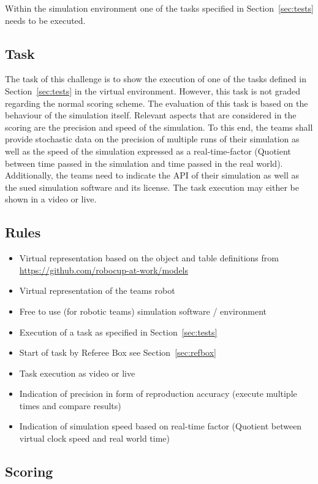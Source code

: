   Within the simulation environment one of the tasks specified in Section~\ref{sec:tests} needs to be executed.

\subsection{Task}

The task of this challenge is to show the execution of one of the tasks defined in Section~\ref{sec:tests} in the virtual environment. However, this task is not graded regarding the normal scoring scheme. The evaluation of this task is based on the behaviour of the simulation itself. Relevant aspects that are considered in the scoring are the precision and speed of the simulation. To this end, the teams shall provide stochastic data on the precision of multiple runs of their simulation  as well as the speed of the simulation expressed as a real-time-factor (Quotient between time passed in the simulation and time passed in the real world). Additionally, the teams need to indicate the API of their simulation as well as the sued simulation software and its license. The task execution may either be shown in a video or live. 

\subsection{Rules}

\begin{itemize}
  \item Virtual representation based on the object and table definitions from \url{https://github.com/robocup-at-work/models}
  \item Virtual representation of the teams robot
  \item Free to use (for robotic teams) simulation software / environment
  \item Execution of a task as specified in Section~\ref{sec:tests}
  \item Start of task by Referee Box see Section~\ref{sec:refbox}
  \item Task execution as video or live
  \item Indication of precision in form of reproduction accuracy (execute multiple times and compare results)
  \item Indication of simulation speed based on real-time factor (Quotient between virtual clock speed and real world time)
\end{itemize}

\subsection{Scoring}

